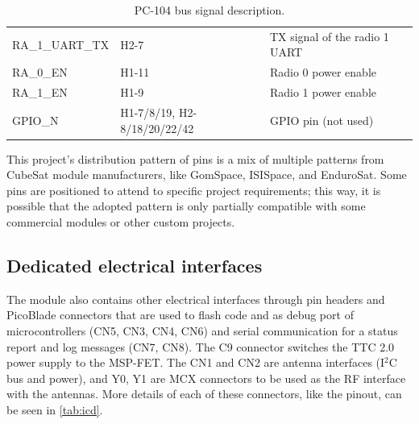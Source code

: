 \begin{table}[!ht]
\begin{tabular}{lL{0.3\textwidth}l}
        RA\_1\_UART\_TX  & H2-7                             & TX signal of the radio 1 UART         \\
        RA\_0\_EN        & H1-11                            & Radio 0 power enable                  \\
        RA\_1\_EN        & H1-9                             & Radio 1 power enable                  \\
        GPIO\_N          & H1-7/8/19, H2-8/18/20/22/42      & GPIO pin (not used)                   \\
        \bottomrule[1.5pt]
    \end{tabular}
    \caption{PC-104 bus signal description.}
    \label{tab:pc104-signals}
\end{table}

This project's distribution pattern of pins is a mix of multiple patterns from CubeSat module manufacturers, like GomSpace, ISISpace, and EnduroSat. Some pins are positioned to attend to specific project requirements; this way, it is possible that the adopted pattern is only partially compatible with some commercial modules or other custom projects.

\subsection{Dedicated electrical interfaces}

The module also contains other electrical interfaces through pin headers and PicoBlade connectors that are used to flash code and as debug port of microcontrollers (CN5, CN3, CN4, CN6) and serial communication for a status report and log messages (CN7, CN8). The C9 connector switches the TTC 2.0 power supply to the MSP-FET. The CN1 and CN2 are antenna interfaces (I$^{2}$C bus and power), and Y0, Y1 are MCX connectors to be used as the RF interface with the antennas. More details of each of these connectors, like the pinout, can be seen in \autoref{tab:icd}.

